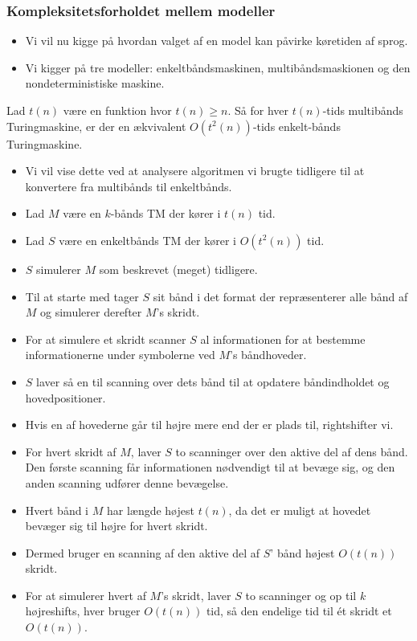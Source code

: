 \begin{frame}[allowframebreaks]
	\frametitle{Kompleksitetsforholdet mellem modeller}

	\begin{itemize}
		\item Vi vil nu kigge på hvordan valget af en model kan påvirke køretiden af sprog.
		\item Vi kigger på tre modeller: enkeltbåndsmaskinen, multibåndsmaskionen og den nondeterministiske maskine.
	\end{itemize}

	\begin{theorem}
		Lad $t(n)$ være en funktion hvor $t(n) \ge n$. Så for hver $t(n)$-tids multibånds Turingmaskine, er der en ækvivalent $O(t^{2}(n))$-tids enkelt-bånds Turingmaskine.
	\end{theorem}
	\begin{itemize}
		\item Vi vil vise dette ved at analysere algoritmen vi brugte tidligere til at konvertere fra multibånds til enkeltbånds.
		\item Lad $M$ være en $k$-bånds TM der kører i $t(n)$ tid.
		\item Lad $S$ være en enkeltbånds TM der kører i $O(t^{2}(n))$ tid.
		\item $S$ simulerer $M$ som beskrevet (meget) tidligere.
		\item Til at starte med tager $S$ sit bånd i det format der repræsenterer alle bånd af $M$ og simulerer derefter $M$'s skridt.
		\item For at simulere et skridt scanner $S$ al informationen for at bestemme informationerne under symbolerne ved $M$'s båndhoveder.
		\item $S$ laver så en til scanning over dets bånd til at opdatere båndindholdet og hovedpositioner.
		\item Hvis en af hovederne går til højre mere end der er plads til, rightshifter vi.
		\item For hvert skridt af $M$, laver $S$ to scanninger over den aktive del af dens bånd. Den første scanning får informationen nødvendigt til at bevæge sig, og den anden scanning udfører denne bevægelse.
		\item Hvert bånd i $M$ har længde højest $t(n)$, da det er muligt at hovedet bevæger sig til højre for hvert skridt.
		\item Dermed bruger en scanning af den aktive del af $S$' bånd højest $O(t(n))$ skridt.
		\item For at simulerer hvert af $M$'s skridt, laver $S$ to scanninger og op til $k$  højreshifts, hver bruger $O(t(n))$ tid, så den endelige tid til ét skridt et $O(t(n))$.

\end{itemize}
\end{frame}
